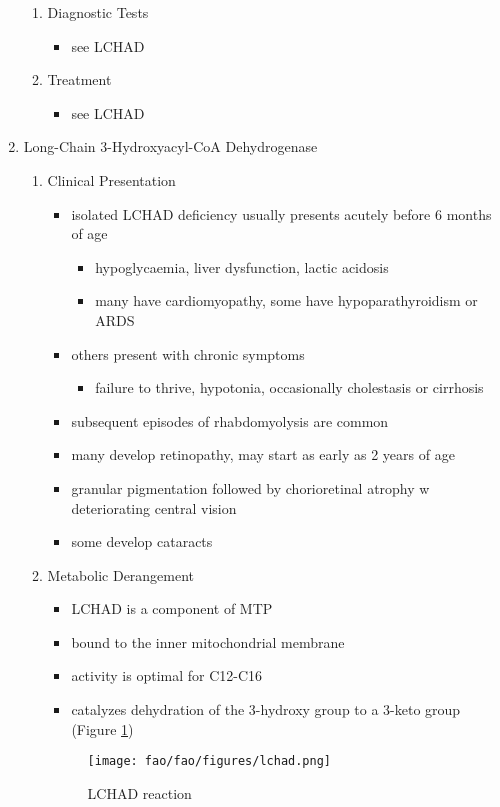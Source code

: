 \documentclass{scrartcl}
\begin{document}
\begin{enumerate}
\begin{enumerate}
\item Diagnostic Tests
\label{sec:org6ff4563}
\begin{itemize}
\item see LCHAD
\end{itemize}

\item Treatment
\label{sec:orga86af72}
\begin{itemize}
\item see LCHAD
\end{itemize}
\end{enumerate}

\item Long-Chain 3-Hydroxyacyl-CoA Dehydrogenase
\label{sec:org3dc1396}
\begin{enumerate}
\item Clinical Presentation
\label{sec:orga14e78b}
\begin{itemize}
\item isolated LCHAD deficiency usually presents acutely before 6 months of age
\begin{itemize}
\item hypoglycaemia, liver dysfunction, lactic acidosis
\item many have cardiomyopathy, some have hypoparathyroidism or ARDS
\end{itemize}
\item others present with chronic symptoms
\begin{itemize}
\item failure to thrive, hypotonia, occasionally cholestasis or cirrhosis
\end{itemize}
\item subsequent episodes of rhabdomyolysis are common
\item many develop retinopathy, may start as early as 2 years of age
\item granular pigmentation followed by chorioretinal atrophy w deteriorating central vision
\item some develop cataracts
\end{itemize}
\item Metabolic Derangement
\label{sec:org2d237f2}
\begin{itemize}
\item LCHAD is a component of MTP
\item bound to the inner mitochondrial membrane
\item activity is optimal for C12-C16
\item catalyzes dehydration of the 3-hydroxy group to a 3-keto group
(Figure \ref{fig:org01d87b7})
\end{itemize}
\begin{figure}[htbp]
\centering
\texttt{[image: fao/fao/figures/lchad.png]}
\caption{\label{fig:org01d87b7}LCHAD reaction}
\end{figure}


\end{enumerate}
\end{enumerate}
\end{document}
